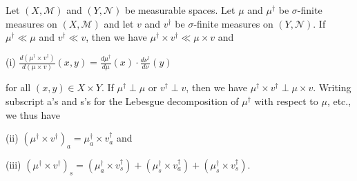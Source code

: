 Let $(X, \mathcal{M})$ and $(Y, \mathcal{N})$ be measurable spaces. Let $\mu$ and $\mu^\dagger$ be $\sigma$-finite measures on $(X, \mathcal{M})$ and let $v$ and $v^\dagger$ be $\sigma$-finite measures on $(Y, \mathcal{N})$. If $\mu^\dagger \ll \mu$ and $v^\dagger \ll v$, then we have $\mu^\dagger \times v^\dagger \ll \mu \times v$ and

(i) $\frac{d(\mu^\dagger \times v^\dagger)}{d(\mu \times v)}(x, y) = \frac{d\mu^\dagger}{d\mu}(x) \cdot \frac{d\nu^\dagger}{d\nu}(y)$

for all $(x, y) \in X \times Y$. If $\mu^\dagger \perp \mu$ or $v^\dagger \perp v$, then we have $\mu^\dagger \times v^\dagger \perp \mu \times v$. Writing subscript a's and s's for the Lebesgue decomposition of $\mu^\dagger$ with respect to $\mu$, etc., we thus have

(ii) $(\mu^\dagger \times v^\dagger)_a = \mu_a^\dagger \times v_a^\dagger$ and

(iii) $(\mu^\dagger \times v^\dagger)_s = (\mu_a^\dagger \times v_s^\dagger) + (\mu_s^\dagger \times v_a^\dagger) + (\mu_s^\dagger \times v_s^\dagger)$.